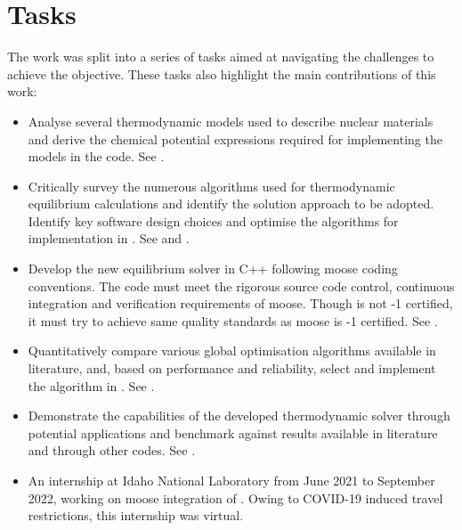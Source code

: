 \section{Tasks}
    The work was split into a series of tasks aimed at navigating the challenges to achieve the objective. These tasks also highlight the main contributions of this work:
    \begin{itemize}
        \item Analyse several thermodynamic models used to describe nuclear materials and derive the chemical potential expressions required for implementing the models in the code. See .
        \item Critically survey the numerous algorithms used for thermodynamic equilibrium calculations and identify the solution approach to be adopted. Identify key software design choices and optimise the algorithms for implementation in {\GEM}. See  and .
        \item Develop the new equilibrium solver in C++ following \gls{moose} coding conventions. The code must meet the rigorous source code control, continuous integration and verification requirements of \gls{moose}. Though {\GEM} is not -{1} certified, it must try to achieve same quality standards as \gls{moose} is -{1} certified. See .
        \item Quantitatively compare various global optimisation algorithms available in literature, and, based on performance and reliability, select and implement the algorithm in {\GEM}. See .
        \item Demonstrate the capabilities of the developed thermodynamic solver through potential applications and benchmark against results available in literature and through other codes. See .
        \item An internship at Idaho National Laboratory from June 2021 to September 2022, working on \gls{moose} integration of \GEM. Owing to COVID-19 induced travel restrictions, this internship was virtual.
    \end{itemize}

